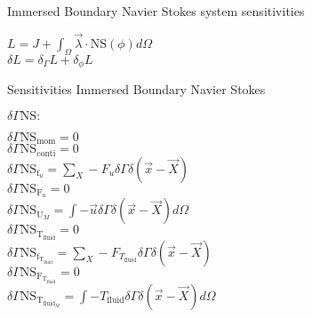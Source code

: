 \documentclass[10pt]{article} %
\begin{document}
\begin{center}
\begin{flushleft}
	Immersed Boundary Navier Stokes system sensitivities
\end{flushleft}
$L = J + \int_{\Omega} \vec{\lambda} \cdot  \text{NS}(\phi)  d\Omega$\\
$\delta L = \delta_\Gamma L + \delta_\phi L$\\
\begin{flushleft}
	Sensitivities Immersed Boundary Navier Stokes
\end{flushleft}
\begin{flushleft}
	$\delta \Gamma \text{NS}:$
\end{flushleft}
	$\delta \Gamma \text{NS}_{\text{mom}} = 0$\\
	$\delta \Gamma \text{NS}_{\text{conti}} = 0$\\
	$\delta \Gamma \text{NS}_{\text{f}_u} = \sum_X -F_u \delta \Gamma \delta(\vec{x}-\vec{X})$\\
	$\delta \Gamma \text{NS}_{\text{F}_u} = 0$\\
	$\delta \Gamma \text{NS}_{\text{U}_M} = \int -\vec{u} \delta \Gamma \delta (\vec{x}-\vec{X}) d\Omega$\\
	$\delta \Gamma \text{NS}_{\text{T}_{\text{fluid}}} = 0$\\
	$\delta \Gamma \text{NS}_{\text{f}_{\text{T}_{\text{fluid}}}} = \sum_X -F_{T_{\text{fluid}}} \delta \Gamma \delta(\vec{x}-\vec{X})$\\
	$\delta \Gamma \text{NS}_{\text{F}_{\text{T}_{\text{fluid}}}} = 0$\\
	$\delta \Gamma \text{NS}_{\text{T}_{\text{fluid}_M}} = \int -T_{\text{fluid}} \delta \Gamma \delta (\vec{x}-\vec{X})d\Omega$\\
\end{center}
\end{document}
